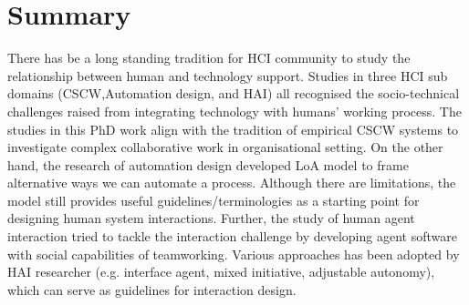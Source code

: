 

\section{Summary}


There has be a long standing tradition for \ac{HCI} community to study the relationship between human and technology support. Studies in three \ac{HCI} sub domains (\ac{CSCW},Automation design, and \acf{HAI}) all recognised the socio-technical challenges raised from integrating technology with humans' working process. The studies in this PhD work align with the tradition of empirical \ac{CSCW} systems to investigate complex collaborative work in organisational setting.  On the other hand, the research of automation design developed \ac{LoA} model to frame alternative ways we can automate a process. Although there are limitations, the model still provides useful guidelines/terminologies as a starting point for designing human system interactions. Further, the study of human agent interaction tried to tackle the interaction challenge by developing agent software with social capabilities of teamworking. Various approaches has been adopted by \ac{HAI} researcher (e.g. interface agent, mixed initiative, adjustable autonomy), which can serve as guidelines for interaction design.\\

